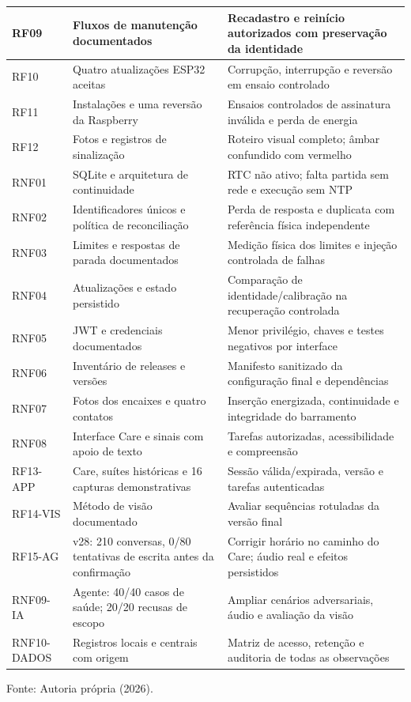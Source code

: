{\begin{longtable}{p{}p{}p{}}
RF09 & Fluxos de manutenção documentados & Recadastro e reinício autorizados com preservação da identidade\\\hline
RF10 & Quatro atualizações ESP32 aceitas & Corrupção, interrupção e reversão em ensaio controlado\\\hline
RF11 & Instalações e uma reversão da Raspberry & Ensaios controlados de assinatura inválida e perda de energia\\\hline
RF12 & Fotos e registros de sinalização & Roteiro visual completo; âmbar confundido com vermelho\\\hline
RNF01 & SQLite e arquitetura de continuidade & RTC não ativo; falta partida sem rede e execução sem NTP\\\hline
RNF02 & Identificadores únicos e política de reconciliação & Perda de resposta e duplicata com referência física independente\\\hline
RNF03 & Limites e respostas de parada documentados & Medição física dos limites e injeção controlada de falhas\\\hline
RNF04 & Atualizações e estado persistido & Comparação de identidade/calibração na recuperação controlada\\\hline
RNF05 & JWT e credenciais documentados & Menor privilégio, chaves e testes negativos por interface\\\hline
RNF06 & Inventário de releases e versões & Manifesto sanitizado da configuração final e dependências\\\hline
RNF07 & Fotos dos encaixes e quatro contatos & Inserção energizada, continuidade e integridade do barramento\\\hline
RNF08 & Interface Care e sinais com apoio de texto & Tarefas autorizadas, acessibilidade e compreensão\\\hline
RF13-APP & Care, suítes históricas e 16 capturas demonstrativas & Sessão válida/expirada, versão e tarefas autenticadas\\\hline
RF14-VIS & Método de visão documentado & Avaliar sequências rotuladas da versão final\\\hline
RF15-AG & v28: 210 conversas, 0/80 tentativas de escrita antes da confirmação & Corrigir horário no caminho do Care; áudio real e efeitos persistidos\\\hline
RNF09-IA & Agente: 40/40 casos de saúde; 20/20 recusas de escopo & Ampliar cenários adversariais, áudio e avaliação da visão\\\hline
RNF10-DADOS & Registros locais e centrais com origem & Matriz de acesso, retenção e auditoria de todas as observações\\\hline
\end{longtable}\noindent Fonte: Autoria própria (2026).\par}

